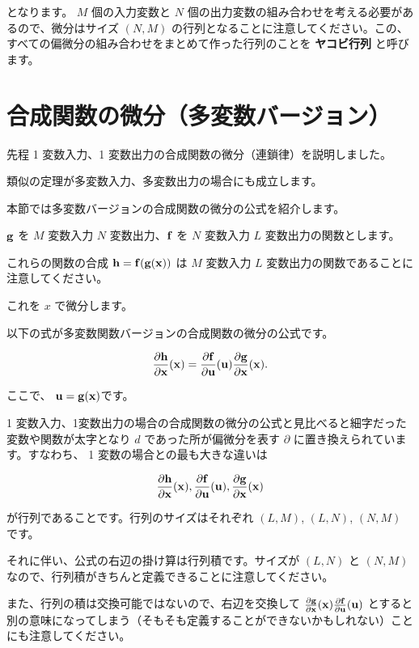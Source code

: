 となります。 $M$ 個の入力変数と $N$ 個の出力変数の組み合わせを考える必要があるので、微分はサイズ $(N, M)$ の行列となることに注意してください。この、すべての偏微分の組み合わせをまとめて作った行列のことを \textbf{ヤコビ行列} と呼びます。


\section{合成関数の微分（多変数バージョン）}


先程 1 変数入力、1 変数出力の合成関数の微分（連鎖律）を説明しました。

類似の定理が多変数入力、多変数出力の場合にも成立します。

本節では多変数バージョンの合成関数の微分の公式を紹介します。


${\bf g}$ を $M$ 変数入力 $N$ 変数出力、${\bf f}$ を $N$ 変数入力 $L$ 変数出力の関数とします。

これらの関数の合成 ${\bf h} = {\bf f}({\bf g} ({\bf x}))$ は $M$ 変数入力 $L$ 変数出力の関数であることに注意してください。

これを $x$ で微分します。

以下の式が多変数関数バージョンの合成関数の微分の公式です。


\[
\frac{\partial {\bf h}}{\partial {\bf x}}({\bf x})  = \frac{\partial {\bf f}}{\partial {\bf u}}({\bf u}) \frac{\partial {\bf g}}{\partial {\bf x}}({\bf x}).
\]


ここで、 ${\bf u} = {\bf g}({\bf x})$です。


1 変数入力、1変数出力の場合の合成関数の微分の公式と見比べると細字だった変数や関数が太字となり $d$ であった所が偏微分を表す $\partial$ に置き換えられています。すなわち、 1 変数の場合との最も大きな違いは


\[
\frac{\partial {\bf h}}{\partial {\bf x}}({\bf x}),
\frac{\partial {\bf f}}{\partial {\bf u}}({\bf u}),
\frac{\partial {\bf g}}{\partial {\bf x}}({\bf x})
\]


が行列であることです。行列のサイズはそれぞれ $(L, M)$, $(L, N)$, $(N, M)$ です。

それに伴い、公式の右辺の掛け算は行列積です。サイズが $(L, N)$ と $(N, M)$ なので、行列積がきちんと定義できることに注意してください。

また、行列の積は交換可能ではないので、右辺を交換して $\frac{\partial {\bf g}}{\partial {\bf x}}({\bf x}) \frac{\partial {\bf f}}{\partial {\bf u}}({\bf u})$ とすると別の意味になってしまう（そもそも定義することができないかもしれない）ことにも注意してください。


